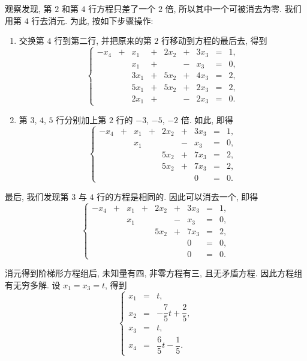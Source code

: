 观察发现, 第 $2$ 和第 $4$ 行方程只差了一个 $2$ 倍, 所以其中一个可被消去为零. 我们用第 $4$ 行去消元. 为此, 按如下步骤操作:
\begin{enumerate}
    \item 交换第 $4$ 行到第二行, 并把原来的第 $2$ 行移动到方程的最后去, 得到
\[
\left\{
\begin{alignedat}{5}
-x_4 &{}+{}&  x_1 &{}+{}& 2x_2 &{}+{}& 3x_3 &{}={} & 1, \\
     &{} {}&  x_1 &{}+{}&      &{}-{}&  x_3 &{}={} & 0, \\
     &{} {}& 3x_1 &{}+{}& 5x_2 &{}+{}& 4x_3 &{}={} & 2, \\
     &{} {}& 5x_1 &{}+{}& 5x_2 &{}+{}& 2x_3 &{}={} & 2, \\
     &{} {}& 2x_1 &{}+{}&      &{}-{}& 2x_3 &{}={} & 0. 
\end{alignedat}
\right.
\]
\item 第 $3$, $4$, $5$ 行分别加上第 $2$ 行的 $-3$, $-5$, $-2$ 倍. 如此, 即得
\[
\left\{
\begin{alignedat}{5}
-x_4 &{}+{}&  x_1 &{}+{}& 2x_2 &{}+{}& 3x_3 &{}={} & 1, \\
     &{} {}&  x_1 &{} {}&      &{}-{}&  x_3 &{}={} & 0, \\
     &{} {}&      &{} {}& 5x_2 &{}+{}& 7x_3 &{}={} & 2, \\
     &{} {}&      &{} {}& 5x_2 &{}+{}& 7x_3 &{}={} & 2, \\
     &{} {}&      &{} {}&      &{} {}& 0    &{}={} & 0. 
\end{alignedat}
\right.
\]
\end{enumerate}

最后, 我们发现第 $3$ 与 $4$ 行的方程是相同的. 因此可以消去一个, 即得
\[
\left\{
\begin{alignedat}{5}
-x_4 &{}+{}&  x_1 &{}+{}& 2x_2 &{}+{}& 3x_3 &{}={} & 1, \\
     &{} {}&  x_1 &{} {}&      &{}-{}&  x_3 &{}={} & 0, \\
     &{} {}&      &{} {}& 5x_2 &{}+{}& 7x_3 &{}={} & 2, \\
     &{} {}&      &{} {}&      &{} {}& 0    &{}={} & 0, \\
     &{} {}&      &{} {}&      &{} {}& 0    &{}={} & 0. 
\end{alignedat}
\right.
\]

消元得到阶梯形方程组后, 未知量有四, 非零方程有三, 且无矛盾方程. 因此方程组有无穷多解. 设 $x_1 = x_3 = t$, 得到
\[
    \left\{
    \begin{aligned}
    x_1 &{}={} & t, \\
    x_2 &{}={} & -\dfrac{7}{5}t + \dfrac{2}{5}, \\
    x_3 &{}={} & t, \\
    x_4 &{}={} & \dfrac{6}{5}t - \dfrac{1}{5}.
    \end{aligned}
    \right.
\]

